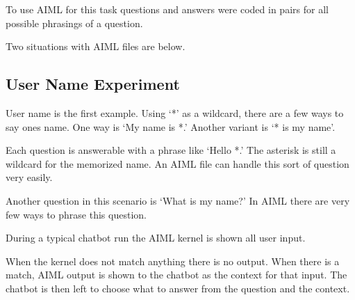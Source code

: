 To use AIML for this task questions and answers were coded in pairs for all possible phrasings of a question.



Two situations with AIML files are below.

\subsection{User Name Experiment}
User name is the first example. Using `*' as a wildcard, there are a few ways to say ones name. One way is `My name is *.' Another variant is `* is my name'. %

Each question is answerable with a phrase like `Hello *.' The asterisk is still a wildcard for the memorized name. An AIML file can handle this sort of question very easily. %

Another question in this scenario is `What is my name?' In AIML there are very few ways to phrase this question. %

During a typical chatbot run the AIML kernel is shown all user input.%

When the kernel does not match anything there is no output. When there is a match, AIML output is shown to the chatbot as the context for that input. 
The chatbot is then left to choose what to answer from the question and the context. 


